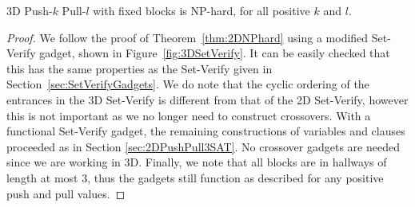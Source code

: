 \begin{theorem}
3D Push-$k$ Pull-$l$ with fixed blocks is NP-hard, for all positive $k$ and $l$.
\end{theorem}
\begin{proof}
We follow the proof of Theorem~\ref{thm:2DNPhard} using a modified Set-Verify gadget, shown in Figure~\ref{fig:3DSetVerify}.  It can be easily checked that this has the same properties as the Set-Verify given in Section~\ref{sec:SetVerifyGadgets}. We do note that the cyclic ordering of the entrances in the 3D Set-Verify is different from that of the 2D Set-Verify, however this is not important as we no longer need to construct crossovers. With a functional Set-Verify gadget, the remaining constructions of variables and clauses proceeded as in Section \ref{sec:2DPushPull3SAT}. No crossover gadgets are needed since we are working in 3D. Finally, we note that all blocks are in hallways of length at most 3, thus the gadgets still function as described for any positive push and pull values.


\end{proof}




